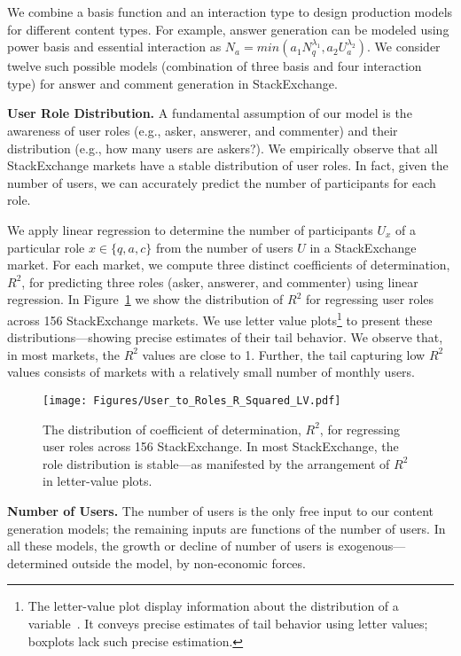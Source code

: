 We combine a basis function and an interaction type to design production models for different content types. For example, answer generation can be modeled using power basis and essential interaction as $N_a = min(a_1N_q^{\lambda_1}, a_2U_a^{\lambda_2})$. We consider twelve such possible models (combination of three basis and four interaction type) for answer and comment generation in StackExchange.

\textbf{User Role Distribution.} A fundamental assumption of our model is the awareness of user roles (e.g., asker, answerer, and commenter) and their distribution (e.g., how many users are askers?). We empirically observe that all StackExchange markets have a stable distribution of user roles. In fact, given the number of users, we can accurately predict the number of participants for each role. 

We apply linear regression to determine the number of participants $U_x$ of a particular role $x \in \{q, a, c\}$ from the number of users $U$ in a StackExchange market. For each market, we compute three distinct coefficients of determination, $R^2$, for predicting three roles (asker, answerer, and commenter) using linear regression. In Figure~\ref{fig:roles} we show the distribution of $R^2$ for regressing user roles across 156 StackExchange markets. We use letter value plots\footnote{The letter-value plot display information about the distribution of a variable~\cite{Hofmann2017}. It conveys precise estimates of tail behavior using letter values; boxplots lack such precise estimation.} to present these distributions---showing precise estimates of their tail behavior. We observe that, in most markets, the $R^2$ values are close to 1. Further, the tail capturing low $R^2$ values consists of markets with a relatively small number of monthly users.

\begin{figure}[hbt]
\centering
\texttt{[image: Figures/User\_to\_Roles\_R\_Squared\_LV.pdf]}
\caption{The distribution of coefficient of determination, $R^2$, for regressing user roles across 156 StackExchange. In most StackExchange, the role distribution is stable---as manifested by the arrangement of $R^2$ in letter-value plots.}
\label{fig:roles}
\end{figure}

\textbf{Number of Users.} The number of users is the only free input to our content generation models; the remaining inputs are functions of the number of users. In all these models, the growth or decline of number of users is exogenous---determined outside the model, by non-economic forces.



